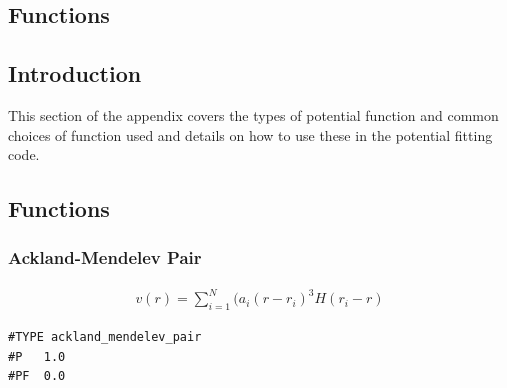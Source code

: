 \documentclass[12pt,twoside]{manual}
\begin{document}



\begin{appendices}




\chapter{Functions}

\section{Introduction}

This section of the appendix covers the types of potential function and common choices of function used and details on how to use these in the potential fitting code.



\section{Functions}



\subsection{Ackland-Mendelev Pair}

\begin{equation}
\begin{split}
v(r) = \sum_{i=1}^N (a_i (r - r_i)^3 H(r_i - r)
\end{split}
\label{eq:ackland_mendelev_pair}
\end{equation}

\begin{lstlisting}[style=pseudocode,caption={Ackland Mendelev Pair}]
#TYPE ackland_mendelev_pair
#P   1.0
#PF  0.0
\end{lstlisting}


\end{appendices}
\end{document}
